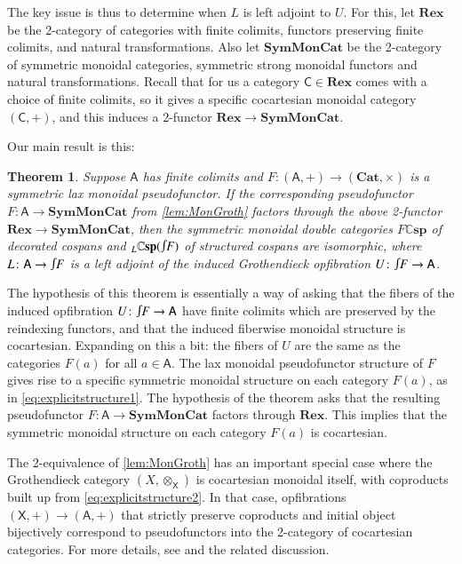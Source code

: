 \documentclass[a4paper,onecolumn, superscriptaddress,10pt, accepted=2022-03-25, issue=SS, volume=VV, shorttitle=papers/compositionality-VV-SS]{compositionalityarticle}
\let\maps\colon
\newtheorem{thm}{Theorem}[section]
\newcommand{\A}{\mathsf{A}}
\newcommand{\C}{\mathsf{C}}
\newcommand{\X}{\mathsf{X}}
\newcommand{\bicat}{\mathbf}
\newcommand{\Cat}{\bicat{Cat}}
\newcommand{\Rex}{\bicat{Rex}}
\newcommand{\SMC}{\bicat{SymMonCat}}
\newcommand{\double}[1]{\mathbf{\mathbb #1}}
\newcommand{\lCsp}{\double{Csp}}
\newcommand{\inta}{\raisebox{.3\depth}{$\smallint\hspace{-.01in}$}}
\begin{document}
The key issue is thus to determine when $L$ is left adjoint to $U$.  For this, let $\Rex$ be the 2-category of categories with finite colimits, functors preserving finite colimits, and natural transformations.  Also let $\SMC$ be the 2-category of symmetric monoidal categories, symmetric strong monoidal functors and natural transformations.   Recall that for us a category $\C \in \Rex$ comes with a choice of finite colimits, so it gives a specific cocartesian monoidal category $(\C,+)$, and this induces a 2-functor $\Rex \to \SMC$.

Our main result is this:

\begin{thm} \label{thm:equiv}
Suppose $\A$ has finite colimits and $F \maps (\A,+) \to (\Cat,\times)$ is a symmetric lax monoidal pseudofunctor. If the corresponding pseudofunctor $F \maps \A \to \SMC$ from \cref{lem:MonGroth}
 factors through the above 2-functor $\Rex\to\SMC$, then the symmetric monoidal double categories $F\lCsp$ of decorated cospans and ${}_L\lCsp(\inta F)$ of structured 
cospans are isomorphic, where $L \maps \A \to \inta F$ is a left adjoint of the induced Grothendieck opfibration $U \maps \inta F \to \A$.
\end{thm}

The hypothesis of this theorem is essentially a way of asking that the fibers of the induced opfibration $U \maps \inta F \to \A$ have finite colimits which are preserved by the reindexing functors, and that the induced fiberwise monoidal structure is cocartesian.   Expanding on this a bit:
the fibers of $U$ are the same as the categories $F(a)$ for all $a \in \A$.   The lax monoidal pseudofunctor structure of $F$ gives rise to a specific symmetric monoidal structure on each category $F(a)$, as in \cref{eq:explicitstructure1}.  The hypothesis of the theorem asks that the resulting pseudofunctor $F \maps \A \to \SMC$ factors through $\Rex$.  This implies
that the symmetric monoidal structure on each category $F(a)$ is cocartesian.

\iffalse
The 2-equivalence of \cref{lem:MonGroth} has an important special case where the Grothendieck category $(X,\otimes_\X)$ is cocartesian monoidal itself, with coproducts built up from \cref{eq:explicitstructure2}.  In that case, opfibrations $(\X,+) \to (\A,+)$ that strictly preserve coproducts and initial object bijectively correspond to pseudofunctors into the 2-category of cocartesian categories.  For more details, see \cite[Corollary 4.7]{MV} and the related discussion.
\end{document}
